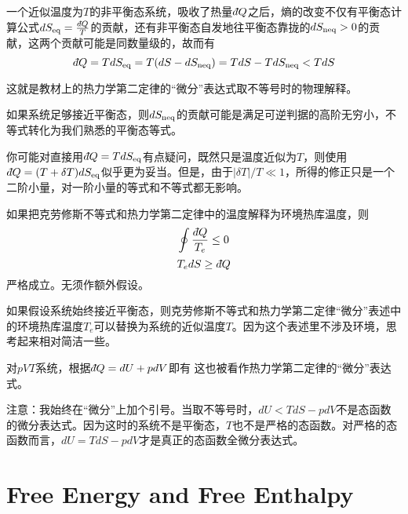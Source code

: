 \documentclass[CJK]{beamer}
\begin{document}
\begin{frame}
\bch
一个近似温度为$T$的非平衡态系统，吸收了热量$\dbar Q$之后，熵的改变不仅有平衡态计算公式$dS_{\rm eq} = \frac{\dbar Q}{T}$的贡献，还有非平衡态自发地往平衡态靠拢的$dS_{\rm neq}>0$的贡献，这两个贡献可能是同数量级的，故而有
$$\dbar Q = T dS_{\rm eq} = T(dS - dS_{\rm neq}) = TdS- TdS_{\rm neq} < TdS$$

\skipline

这就是教材上的热力学第二定律的“微分”表达式取不等号时的物理解释。

如果系统足够接近平衡态，则$dS_{\rm neq}$的贡献可能是满足可逆判据的高阶无穷小，不等式转化为我们熟悉的平衡态等式。

\skipline

{\scriptsize 你可能对直接用$\dbar Q = TdS_{\rm eq} $有点疑问，既然只是温度近似为$T$，则使用
$\dbar Q = (T+\delta T) dS_{\rm eq}$似乎更为妥当。但是，由于$|\delta T|/T\ll 1$，所得的修正只是一个二阶小量，对一阶小量的等式和不等式都无影响。}

\ech
\end{frame}

\begin{frame}
\bchL
如果把克劳修斯不等式和热力学第二定律中的温度解释为环境热库温度，则
{\blue $$\oint \frac{\dbar Q}{T_e} \le 0 $$
$$ T_edS \ge \dbar Q $$}
严格成立。无须作额外假设。

\skipline
如果假设系统始终接近平衡态，则克劳修斯不等式和热力学第二定律“微分”表述中的环境热库温度$T_e$可以替换为系统的近似温度$T$。因为这个表述里不涉及环境，思考起来相对简洁一些。
\echL
\end{frame}


\begin{frame}
\bchL
对$pVT$系统，根据$\dbar Q = dU + pdV$即有
这也被看作热力学第二定律的“微分”表达式。

\skiplines

{\scriptsize
注意：我始终在“微分”上加个引号。当取不等号时，$dU < TdS - pdV$不是态函数的微分表达式。因为这时的系统不是平衡态，$T$也不是严格的态函数。对严格的态函数而言，$dU = TdS - pdV$才是真正的态函数全微分表达式。}
\echL
\end{frame}

\section{Free Energy and Free Enthalpy}
\end{document}
